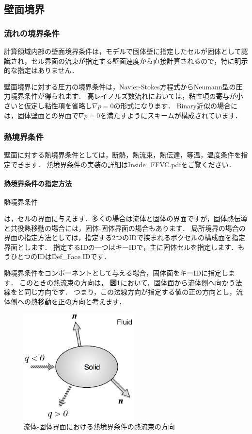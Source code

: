 %
\subsection{壁面境界}

\subsubsection{流れの境界条件}
計算領域内部の壁面境界条件は，モデルで固体壁に指定したセルが固体として認識され，セル界面の流束が指定する壁面速度から直接計算されるので，特に明示的な指定はありません．

壁面境界に対する圧力の境界条件は，Navier-Stokes方程式からNeumann型の圧力境界条件が得られます．
高レイノルズ数流れにおいては，粘性項の寄与が小さいと仮定し粘性項を省略し$\nabla p=0$の形式になります．
Binary近似の場合には，固体壁面との界面で$\nabla p=0$を満たすようにスキームが構成されています．

%
\subsubsection{熱境界条件}
壁面に対する熱境界条件としては，断熱，熱流束，熱伝達，等温，温度条件を指定できます．
熱境界条件の実装の詳細はInside\_FFVC.pdfをご覧ください．

%
\paragraph{熱境界条件の指定方法}
\hypertarget{tgt:spec of heat bc}{熱境界条件}は，セルの界面に与えます．多くの場合は流体と固体の界面ですが，固体熱伝導と共役熱移動の場合には，固体-固体界面の場合もあります．
局所境界の場合の界面の指定方法としては，指定する2つのIDで挟まれるボクセルの構成面を指定界面とします．
指定するIDの一つはキーIDで，主に固体セルを指定します．もうひとつのIDはDef\_Face IDです．

熱境界条件をコンポーネントとして与える場合，固体面をキーIDに指定します．
このときの熱流束の方向は，
\textbf{図\ref{fig:heat bc on solid}}において，固体面から流体側へ向かう法線をと同じ方向です．
つまり，この法線方向が指定する値の正の方向とし，流体側への熱移動を正の方向と考えます．

\begin{figure}[htbp]
\begin{center}
\includegraphics[width=6cm,clip]{heatBC.eps}
\end{center}
\caption{流体-固体界面における熱境界条件の熱流束の方向}
\label{fig:heat bc on solid}
\end{figure}

